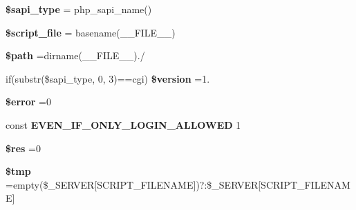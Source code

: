 \begin{DoxyCompactItemize}
\item 
\mbox{\label{tourneedelivraison__lines__contacts_8php_a86e02f00a36d0fcbf274de973b2640d0}} 
{\bfseries \$sapi\+\_\+type} = php\+\_\+sapi\+\_\+name()
\item 
\mbox{\label{tourneedelivraison__lines__contacts_8php_a97b9f047572d6c50f29fbea522f6c17e}} 
{\bfseries \$script\+\_\+file} = basename(\+\_\+\+\_\+\+F\+I\+L\+E\+\_\+\+\_\+)
\item 
\mbox{\label{tourneedelivraison__lines__contacts_8php_a0a4baf0b22973c07685c3981f0d17fc4}} 
{\bfseries \$path} =dirname(\+\_\+\+\_\+\+F\+I\+L\+E\+\_\+\+\_\+).\textquotesingle{}/\textquotesingle{}
\item 
\mbox{\label{tourneedelivraison__lines__contacts_8php_a0a351317886caa2358df1658880c0c78}} 
if(substr(\$sapi\+\_\+type, 0, 3)==\textquotesingle{}cgi\textquotesingle{}) {\bfseries \$version} =\textquotesingle{}1.\textquotesingle{}
\item 
\mbox{\label{tourneedelivraison__lines__contacts_8php_aeba2ab722cedda53dbb7ec1a59f45550}} 
{\bfseries \$error} =0
\item 
\mbox{\label{tourneedelivraison__lines__contacts_8php_a2b87986264c1ca3cddb96a106af7b37a}} 
const {\bfseries E\+V\+E\+N\+\_\+\+I\+F\+\_\+\+O\+N\+L\+Y\+\_\+\+L\+O\+G\+I\+N\+\_\+\+A\+L\+L\+O\+W\+ED} 1
\item 
\mbox{\label{tourneedelivraison__lines__contacts_8php_a49a8a4009b02e49717caa88b128affc5}} 
{\bfseries \$res} =0
\item 
\mbox{\label{tourneedelivraison__lines__contacts_8php_a57024d47cf8348153f5fdda16f8fefa9}} 
{\bfseries \$tmp} =empty(\$\+\_\+\+S\+E\+R\+V\+ER\mbox{[}\textquotesingle{}S\+C\+R\+I\+P\+T\+\_\+\+F\+I\+L\+E\+N\+A\+ME\textquotesingle{}\mbox{]})?\textquotesingle{}\textquotesingle{}\+:\$\+\_\+\+S\+E\+R\+V\+ER\mbox{[}\textquotesingle{}S\+C\+R\+I\+P\+T\+\_\+\+F\+I\+L\+E\+N\+A\+ME\textquotesingle{}\mbox{]}

\end{DoxyCompactItemize}
